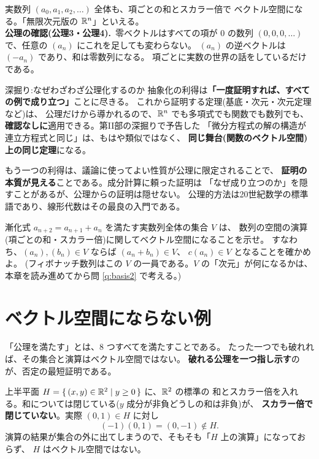 \begin{rei}[数列の空間]
実数列 $(a_0, a_1, a_2, \dots)$ 全体も、項ごとの和とスカラー倍で
ベクトル空間になる。「無限次元版の $\mathbb{R}^n$」といえる。\\
\textbf{公理の確認(公理3・公理4).}\ 零ベクトルはすべての項が $0$ の数列
$(0, 0, 0, \dots)$ で、任意の $(a_n)$ にこれを足しても変わらない。
$(a_n)$ の逆ベクトルは $(-a_n)$ であり、和は零数列になる。
項ごとに実数の世界の話をしているだけである。
\end{rei}

\begin{itembox}[l]{深掘り:なぜわざわざ公理化するのか}
抽象化の利得は\textbf{「一度証明すれば、すべての例で成り立つ」}ことに尽きる。
これから証明する定理(基底・次元・次元定理など)は、
公理だけから導かれるので、$\mathbb{R}^n$ でも多項式でも関数でも数列でも、
\textbf{確認なしに}適用できる。第II部の深掘りで予告した
「微分方程式の解の構造が連立方程式と同じ」は、もはや類似ではなく、
\textbf{同じ舞台(関数のベクトル空間)上の同じ定理}になる。

もう一つの利得は、議論に使ってよい性質が公理に限定されることで、
\textbf{証明の本質が見える}ことである。成分計算に頼った証明は
「なぜ成り立つのか」を隠すことがあるが、公理からの証明は隠せない。
公理的方法は20世紀数学の標準語であり、線形代数はその最良の入門である。
\end{itembox}

\begin{mondai}\label{q:fib}
漸化式 $a_{n+2} = a_{n+1} + a_n$ を満たす実数列全体の集合 $V$ は、
数列の空間の演算(項ごとの和・スカラー倍)に関してベクトル空間になることを示せ。
すなわち、$(a_n), (b_n) \in V$ ならば $(a_n + b_n) \in V$、
$c(a_n) \in V$ となることを確かめよ。
(フィボナッチ数列はこの $V$ の一員である。$V$ の「次元」が何になるかは、
本章を読み進めてから問 \ref{q:basis2} で考える。)
\end{mondai}

\section{ベクトル空間にならない例}

「公理を満たす」とは、$8$ つすべてを満たすことである。
たった一つでも破れれば、その集合と演算はベクトル空間ではない。
\textbf{破れる公理を一つ指し示す}のが、否定の最短証明である。

\begin{hanrei}[演算が閉じていない]\label{ex:halfplane}
上半平面 $H = \{\,(x, y) \in \mathbb{R}^2 \mid y \ge 0\,\}$ に、$\mathbb{R}^2$ の標準の
和とスカラー倍を入れる。和については閉じている($y$ 成分が非負どうしの和は非負)が、
\textbf{スカラー倍で閉じていない}。実際 $(0, 1) \in H$ に対し
\[
(-1)(0, 1) = (0, -1) \notin H.
\]
演算の結果が集合の外に出てしまうので、そもそも「$H$ 上の演算」になっておらず、
$H$ はベクトル空間ではない。
\end{hanrei}


